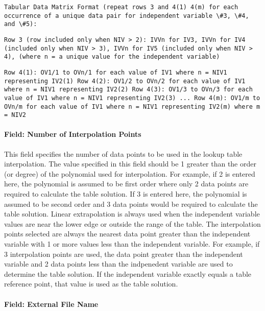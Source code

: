 \begin{lstlisting}
Tabular Data Matrix Format (repeat rows 3 and 4(1) 4(m) for each occurrence of a unique data pair for independent variable \#3, \#4, and \#5):
\end{lstlisting}

\begin{lstlisting}
Row 3 (row included only when NIV > 2): IVVn for IV3, IVVn for IV4 (included only when NIV > 3), IVVn for IV5 (included only when NIV > 4), (where n = a unique value for the independent variable)
\end{lstlisting}

\begin{lstlisting}
Row 4(1): OV1/1 to OVn/1 for each value of IV1 where n = NIV1 representing IV2(1) Row 4(2): OV1/2 to OVn/2 for each value of IV1 where n = NIV1 representing IV2(2) Row 4(3): OV1/3 to OVn/3 for each value of IV1 where n = NIV1 representing IV2(3) ... Row 4(m): OV1/m to OVn/m for each value of IV1 where n = NIV1 representing IV2(m) where m = NIV2
\end{lstlisting}

\paragraph{Field: Number of Interpolation Points}\label{field-number-of-interpolation-points}

This field specifies the number of data points to be used in the lookup table interpolation. The value specified in this field should be 1 greater than the order (or degree) of the polynomial used for interpolation. For example, if 2 is entered here, the polynomial is assumed to be first order where only 2 data points are required to calculate the table solution. If 3 is entered here, the polynomial is assumed to be second order and 3 data points would be required to calculate the table solution. Linear extrapolation is always used when the independent variable values are near the lower edge or outside the range of the table. The interpolation points selected are always the nearest data point greater than the independent variable with 1 or more values less than the independent variable. For example, if 3 interpolation points are used, the data point greater than the independent variable and 2 data points less than the indpenedent variable are used to determine the table solution. If the independent variable exactly equals a table reference point, that value is used as the table solution.

\paragraph{Field: External File Name}\label{field-external-file-name}

